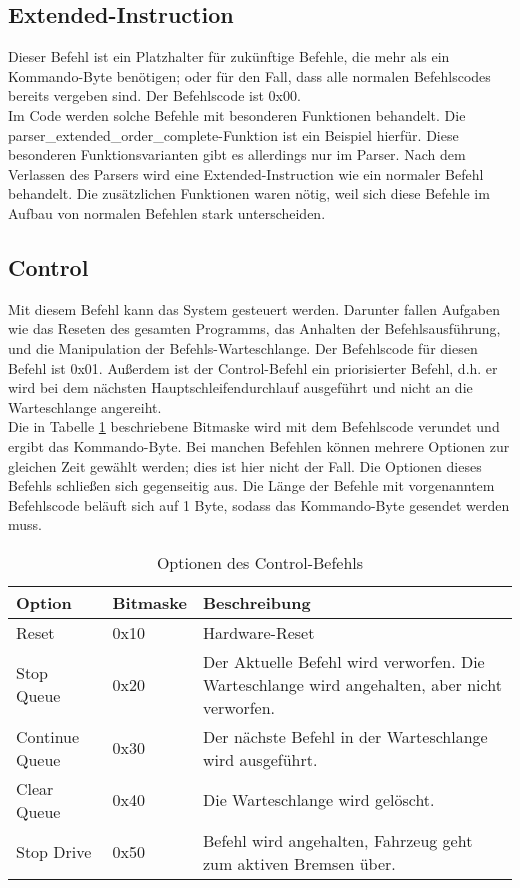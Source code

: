 \subsection{Extended-Instruction}
Dieser Befehl ist ein Platzhalter für zukünftige Befehle, die mehr als ein Kommando-Byte benötigen;
oder für den Fall, dass alle normalen Befehlscodes bereits vergeben sind. Der Befehlscode ist 0x00.\\
Im Code werden solche Befehle mit besonderen Funktionen behandelt. Die 
parser\_\-extended\_\-order\_\-complete-Funktion ist ein Beispiel hierfür. Diese
besonderen Funktionsvarianten gibt es allerdings nur im Parser.
Nach dem Verlassen des Parsers wird eine Extended-Instruction wie ein normaler Befehl behandelt.
Die zusätzlichen Funktionen waren nötig, weil sich diese Befehle im Aufbau von normalen Befehlen stark unterscheiden.

\subsection{Control}
Mit diesem Befehl kann das System gesteuert werden. Darunter fallen Aufgaben wie das
Reseten des gesamten Programms, das Anhalten der Befehlsausführung, und die Manipulation
der Befehls-Warteschlange. Der Befehlscode für diesen Befehl ist 0x01. Außerdem ist der Control-Befehl
ein priorisierter Befehl, d.h. er wird bei dem nächsten Hauptschleifendurchlauf ausgeführt und nicht
an die Warteschlange angereiht.\\
Die in Tabelle \ref{protocol_control} beschriebene Bitmaske wird mit dem Befehlscode verundet
und ergibt das Kommando-Byte. Bei manchen Befehlen können mehrere Optionen zur gleichen Zeit
gewählt werden; dies ist hier nicht der Fall. Die Optionen dieses Befehls schließen sich
gegenseitig aus. Die Länge der Befehle mit vorgenanntem Befehlscode beläuft sich auf 1 Byte, sodass
 das Kommando-Byte gesendet werden muss.
\begin{table}[htb]
\begin{center}
	\begin{tabularx}{\linewidth}{|l|l|X|}
		\hline
		\textbf{Option} & \textbf{Bitmaske} & \textbf{Beschreibung} \\
		\hline
		\hline
		Reset 			& 0x10 				& Hardware-Reset \\
		\hline
		Stop Queue		& 0x20				& Der Aktuelle Befehl wird verworfen. Die Warteschlange wird angehalten, aber nicht verworfen. \\
		\hline
		Continue Queue	& 0x30				& Der nächste Befehl in der Warteschlange wird ausgeführt. \\
		\hline
		Clear Queue		& 0x40				& Die Warteschlange wird gelöscht. \\
		\hline
		Stop Drive		& 0x50				& Befehl wird angehalten, Fahrzeug geht zum aktiven Bremsen über. \\
		\hline
	\end{tabularx}
	\caption{\label{protocol_control} Optionen des Control-Befehls}
\end{center}
\end{table}

